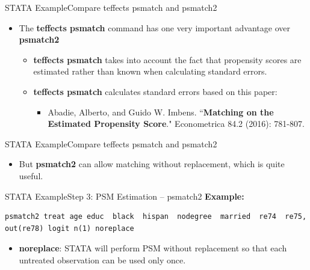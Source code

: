 \documentclass[dvipsnames,hyperref={pdfpagelabels=false}]{beamer}
\begin{document}
\begin{frame}[fragile]{STATA Example}{Compare teffects psmatch and psmatch2}
	\begin{itemize}
		\item The \textbf{teffects psmatch} command has one very important advantage over \textbf{psmatch2}
				\vspace{0.2cm}
			\begin{itemize}		
				\item \textbf{teffects psmatch} takes into account the fact that propensity scores are estimated rather than known when calculating standard errors.
								\vspace{0.2cm}
				\item \textbf{teffects psmatch} calculates standard errors based on this paper:
												\vspace{0.2cm}
							\begin{itemize}		
\item Abadie, Alberto, and Guido W. Imbens. ``\textbf{Matching on the Estimated Propensity Score}." Econometrica 84.2 (2016): 781-807.
								\end{itemize}	
				
				\end{itemize}	
	\end{itemize}
\end{frame}


\begin{frame}[fragile]{STATA Example}{Compare teffects psmatch and psmatch2}
	\begin{itemize}
		\item But \textbf{psmatch2} can allow matching without replacement, which is quite useful. 
	\end{itemize}
\end{frame}


\begin{frame}[fragile]{STATA Example}{Step 3: PSM Estimation -- psmatch2}
	\textbf{Example:}
\begin{lstlisting}
psmatch2 treat age educ  black  hispan  nodegree  married  re74  re75, out(re78) logit n(1) noreplace
\end{lstlisting}
	\begin{itemize}
		\vspace{0.2cm}
		\item \textbf{noreplace}: STATA will perform PSM without replacement so that each untreated observation can be used only once.
	\end{itemize}
\end{frame}
\end{document}
